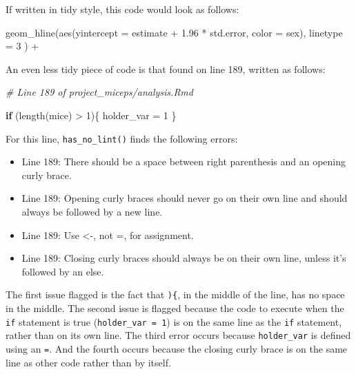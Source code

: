 \documentclass[12pt,twoside]{reedthesis}
\newenvironment{Shaded}{\begin{snugshade}}{\end{snugshade}}
\newcommand{\AttributeTok}[1]{\textcolor[rgb]{0.77,0.63,0.00}{#1}}
\newcommand{\CommentTok}[1]{\textcolor[rgb]{0.56,0.35,0.01}{\textit{#1}}}
\newcommand{\ControlFlowTok}[1]{\textcolor[rgb]{0.13,0.29,0.53}{\textbf{#1}}}
\newcommand{\DecValTok}[1]{\textcolor[rgb]{0.00,0.00,0.81}{#1}}
\newcommand{\FloatTok}[1]{\textcolor[rgb]{0.00,0.00,0.81}{#1}}
\newcommand{\FunctionTok}[1]{\textcolor[rgb]{0.00,0.00,0.00}{#1}}
\newcommand{\NormalTok}[1]{#1}
\newcommand{\OtherTok}[1]{\textcolor[rgb]{0.56,0.35,0.01}{#1}}
\newcommand{\SpecialCharTok}[1]{\textcolor[rgb]{0.00,0.00,0.00}{#1}}
\begin{document}
If written in tidy style, this code would look as follows:
\begin{Shaded}
\begin{Highlighting}[]
\FunctionTok{geom\_hline}\NormalTok{(}\FunctionTok{aes}\NormalTok{(}\AttributeTok{yintercept =}\NormalTok{ estimate }\SpecialCharTok{+} \FloatTok{1.96} \SpecialCharTok{*}\NormalTok{ std.error, }\AttributeTok{color =}\NormalTok{ sex),}
  \AttributeTok{linetype =} \DecValTok{3}
\NormalTok{) }\SpecialCharTok{+} 
\end{Highlighting}
\end{Shaded}
An even less tidy piece of code is that found on line 189, written as follows:
\begin{Shaded}
\begin{Highlighting}[]
\CommentTok{\# Line 189 of \textasciigrave{}project\_miceps/analysis.Rmd\textquotesingle{}}

\ControlFlowTok{if}\NormalTok{ (}\FunctionTok{length}\NormalTok{(mice) }\SpecialCharTok{\textgreater{}} \DecValTok{1}\NormalTok{)\{ holder\_var }\OtherTok{=} \DecValTok{1}\NormalTok{ \}}
\end{Highlighting}
\end{Shaded}
For this line, \texttt{has\_no\_lint()} finds the following errors:
\begin{itemize}
\item
  Line 189: There should be a space between right parenthesis and an opening curly brace.
\item
  Line 189: Opening curly braces should never go on their own line and should always be followed by a new line.
\item
  Line 189: Use \textless-, not =, for assignment.
\item
  Line 189: Closing curly braces should always be on their own line, unless it's followed by an else.
\end{itemize}
The first issue flagged is the fact that \texttt{)\{}, in the middle of the line, has no space in the middle. The second issue is flagged because the code to execute when the \texttt{if} statement is true (\texttt{holder\_var\ =\ 1}) is on the same line as the \texttt{if} statement, rather than on its own line. The third error occurs because \texttt{holder\_var} is defined using an \texttt{=}. And the fourth occurs because the closing curly brace is on the same line as other code rather than by itself.
\end{document}
